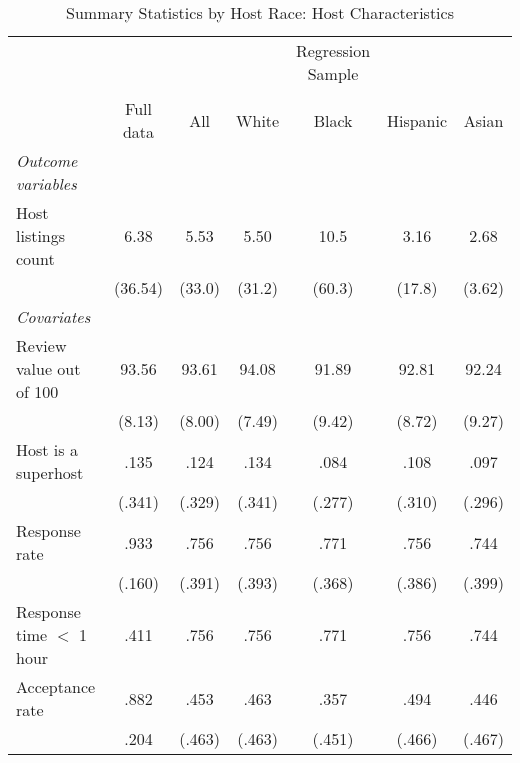 {
	\begin{longtable}{l*{6}{c}}
		\caption{Summary Statistics by Host Race: Host Characteristics}\\
		
		\hline
		&\multicolumn{1}{c}{}&\multicolumn{1}{c}{}&\multicolumn{1}{c}{}&\multicolumn{1}{c}{Regression Sample}&\multicolumn{1}{c}{}&\multicolumn{1}{c}{}\\
		\cline{3-7}\\
			&\multicolumn{1}{c}{Full data}&\multicolumn{1}{c}{All}&\multicolumn{1}{c}{White}&\multicolumn{1}{c}{Black}&\multicolumn{1}{c}{Hispanic}&\multicolumn{1}{c}{Asian}\\
		\hline\hline           
		     
		\textit{Outcome variables} \\
		Host listings count         & 6.38 &      5.53&      5.50 &      10.5&    3.16 & 2.68\\
		& (36.54)	&     (33.0)         &     (31.2)         &     (60.3)         &     (17.8) & 	(3.62)         \\
		
		\textit{Covariates} \\
		\hline
		Review value out of 100      & 93.56  &      93.61	&      94.08	 	&      91.89		&    92.81	 & 		92.24\\
		              &   (8.13)   &     (8.00)         &     (7.49)         &     (9.42)         &     (8.72) 	&	 (9.27)         \\
		
		Host is a superhost    & .135   &      .124		&      .134&      .084 &      .108  	& 	.097\\
		&(.341) & (.329)     &     (.341)         &     (.277)         &     (.310)         &     (.296)         \\

		Response rate      & .933  &       .756		&       .756		&      .771         &      .756  	& 	.744\\
		& (.160) &     (.391)         &     (.393)         &     (.368)         &     (.386)         &		(.399)\\

		Response time $<$ 1 hour      & .411  &       .756		&       .756		&      .771         &      .756  	& 	.744\\

		Acceptance rate      & .882    &      .453&      .463&       .357         &      .494    &	.446     \\
		&.204 &     (.463)         &     (.463)         &     (.451)         &     (.466)         &		(.467)\\


\end{longtable}}
